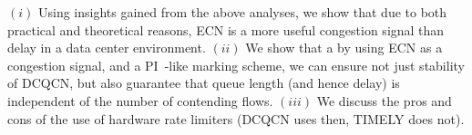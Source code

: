  $(i)$ Using insights gained from the above analyses, we show
that due to both practical and theoretical reasons, ECN is a more useful
congestion signal than delay in a data center environment. $(ii)$ We show that a
by using ECN as a congestion signal, and a PI~\cite{Hollot:PIController}-like
marking scheme, we can ensure not just stability of DCQCN, but also guarantee
that queue length (and hence delay) is independent of the number of contending
flows. $(iii)$ We discuss the pros and cons of the use of hardware rate limiters
(DCQCN uses then, TIMELY does not).

